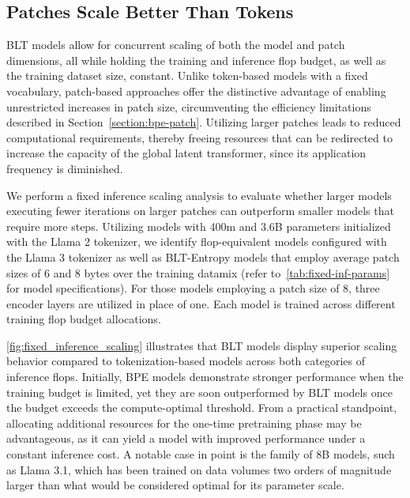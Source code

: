 \subsection{Patches Scale Better Than Tokens} {\textsc BLT} models allow for concurrent scaling of both the model and patch dimensions, all while holding the training and inference flop budget, as well as the training dataset size, constant. Unlike token-based models with a fixed vocabulary, patch-based approaches offer the distinctive advantage of enabling unrestricted increases in patch size, circumventing the efficiency limitations described in Section~\ref{section:bpe-patch}. Utilizing larger patches leads to reduced computational requirements, thereby freeing resources that can be redirected to increase the capacity of the global latent transformer, since its application frequency is diminished.

We perform a fixed inference scaling analysis to evaluate whether larger models executing fewer iterations on larger patches can outperform smaller models that require more steps. Utilizing models with 400m and 3.6B parameters initialized with the Llama 2 tokenizer, we identify flop-equivalent models configured with the Llama 3 tokenizer as well as {\textsc BLT}-Entropy models that employ average patch sizes of 6 and 8 bytes over the training datamix (refer to~\autoref{tab:fixed-inf-params} for model specifications). For those models employing a patch size of 8, three encoder layers are utilized in place of one. Each model is trained across different training flop budget allocations.

\autoref{fig:fixed_inference_scaling} illustrates that {\textsc BLT} models display superior scaling behavior compared to tokenization-based models across both categories of inference flops. Initially, BPE models demonstrate stronger performance when the training budget is limited, yet they are soon outperformed by {\textsc BLT} models once the budget exceeds the compute-optimal threshold. From a practical standpoint, allocating additional resources for the one-time pretraining phase may be advantageous, as it can yield a model with improved performance under a constant inference cost. A notable case in point is the family of 8B models, such as Llama 3.1, which has been trained on data volumes two orders of magnitude larger than what would be considered optimal for its parameter scale.

